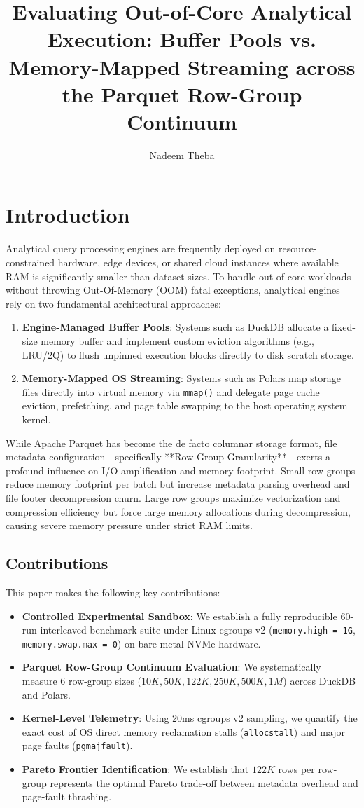 \documentclass[sigconf,nonacm]{acmart}
\title{Evaluating Out-of-Core Analytical Execution: Buffer Pools vs. Memory-Mapped Streaming across the Parquet Row-Group Continuum}
\author{Nadeem Theba}
\affiliation{%
  \institution{Department of Computer Science \& Engineering}
  \city{Workstation Systems Lab}
  \country{USA}
}
\begin{document}
\maketitle

\section{Introduction}
Analytical query processing engines are frequently deployed on resource-constrained hardware, edge devices, or shared cloud instances where available RAM is significantly smaller than dataset sizes. To handle out-of-core workloads without throwing Out-Of-Memory (OOM) fatal exceptions, analytical engines rely on two fundamental architectural approaches:
\begin{enumerate}
    \item \textbf{Engine-Managed Buffer Pools}: Systems such as DuckDB allocate a fixed-size memory buffer and implement custom eviction algorithms (e.g., LRU/2Q) to flush unpinned execution blocks directly to disk scratch storage.
    \item \textbf{Memory-Mapped OS Streaming}: Systems such as Polars map storage files directly into virtual memory via \texttt{mmap()} and delegate page cache eviction, prefetching, and page table swapping to the host operating system kernel.
\end{enumerate}

While Apache Parquet has become the de facto columnar storage format, file metadata configuration---specifically **Row-Group Granularity**---exerts a profound influence on I/O amplification and memory footprint. Small row groups reduce memory footprint per batch but increase metadata parsing overhead and file footer decompression churn. Large row groups maximize vectorization and compression efficiency but force large memory allocations during decompression, causing severe memory pressure under strict RAM limits.

\subsection{Contributions}
This paper makes the following key contributions:
\begin{itemize}
    \item \textbf{Controlled Experimental Sandbox}: We establish a fully reproducible 60-run interleaved benchmark suite under Linux cgroups v2 (\texttt{memory.high = 1G}, \texttt{memory.swap.max = 0}) on bare-metal NVMe hardware.
    \item \textbf{Parquet Row-Group Continuum Evaluation}: We systematically measure 6 row-group sizes ($10K, 50K, 122K, 250K, 500K, 1M$) across DuckDB and Polars.
    \item \textbf{Kernel-Level Telemetry}: Using 20ms cgroups v2 sampling, we quantify the exact cost of OS direct memory reclamation stalls (\texttt{allocstall}) and major page faults (\texttt{pgmajfault}).
    \item \textbf{Pareto Frontier Identification}: We establish that $122K$ rows per row-group represents the optimal Pareto trade-off between metadata overhead and page-fault thrashing.
\end{itemize}
\end{document}
